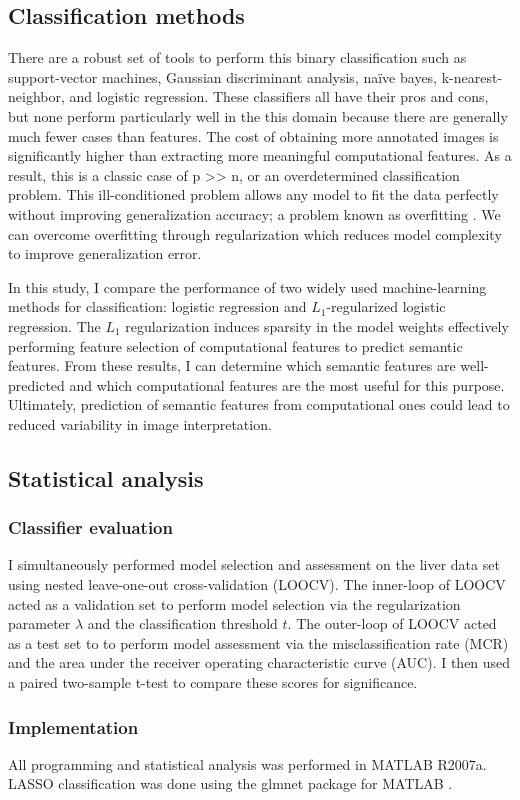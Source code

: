 \subsection{Classification methods}
There are a robust set of tools to perform this binary classification such as support-vector machines, Gaussian discriminant analysis, na\"{i}ve bayes, k-nearest-neighbor, and logistic regression. These classifiers all have their pros and cons, but none perform particularly well in the this domain because there are generally much fewer cases than features. The cost of obtaining more annotated images is significantly higher than extracting more meaningful computational features. As a result, this is a classic case of p >> n, or an overdetermined classification problem. This ill-conditioned problem allows any model to fit the data perfectly without improving generalization accuracy; a problem known as overfitting \cite{Hastie:2009wp,Friedman:2009wm}. We can overcome overfitting through regularization which reduces model complexity to improve generalization error. 

In this study, I compare the performance of two widely used machine-learning methods for classification: logistic regression and $L_1$-regularized logistic regression. The $L_1$ regularization induces sparsity in the model weights effectively performing feature selection of computational features to predict semantic features. From these results, I can determine which semantic features are well-predicted and which computational features are the most useful for this purpose. Ultimately, prediction of semantic features from computational ones could lead to reduced variability in image interpretation.

\subsection{Statistical analysis}
\subsubsection{Classifier evaluation}
I simultaneously performed model selection and assessment on the liver data set using nested leave-one-out cross-validation (LOOCV). The inner-loop of LOOCV acted as a validation set to perform model selection via the regularization parameter $\lambda$ and the classification threshold $t$. The outer-loop of LOOCV acted as a test set to to perform model assessment via the misclassification rate (MCR) and the area under the receiver operating characteristic curve (AUC). I then used a paired two-sample t-test to compare these scores for significance. 

\subsubsection{Implementation}
All programming and statistical analysis was performed in MATLAB R2007a. LASSO classification was done using the glmnet package for MATLAB \cite{Friedman:2009wm}.